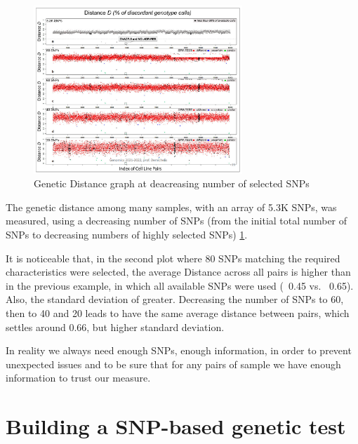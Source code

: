\begin{figure}
	\centering
	\includegraphics[width=0.7\textwidth]{Selected_SNP.PNG}
	\caption{\label{fig:sel_snp}Genetic Distance graph at deacreasing number of
	selected SNPs}
\end{figure}

The genetic distance among many samples, with an array of 5.3K SNPs, was
measured, using a decreasing number of SNPs (from the initial total number of
SNPs to decreasing numbers of highly selected SNPs) \ref{fig:sel_snp}. 

It is noticeable that, in the second plot where 80 SNPs matching the required
characteristics were selected, the average Distance across all pairs is higher
than in the previous example, in which all available SNPs were used (~0.45 vs.
~0.65). Also, the standard deviation of greater. Decreasing the number of SNPs
to 60, then to 40 and 20 leads to have the same average distance between pairs,
which settles around 0.66, but higher standard deviation.

In reality we always need enough SNPs, enough information, in order to prevent
unexpected issues and to be sure that for any pairs of sample we have enough
information to trust our measure. 


\section{Building a SNP-based genetic test}

